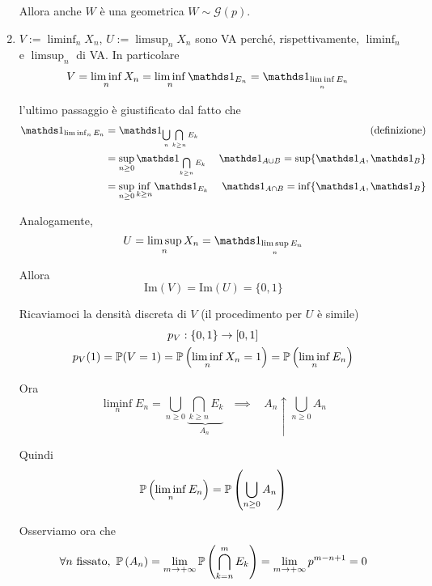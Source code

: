 \begin{enumerate}
Allora anche $W$ è una geometrica $W\sim \mathcal{G}( p)$.
\item $V:=\liminf _{n} X_{n}$, $U:=\limsup _{n} X_{n}$ sono VA perché, rispettivamente, $\liminf _{n}$ e $\limsup _{n}$ di VA. In particolare\begin{align*}
V & =\liminf _{n} X_{n} =\liminf _{n}\Ind_{E_{n}} =\Ind_{\liminf\limits _{n} E_{n}}
\end{align*}

l'ultimo passaggio è giustificato dal fatto che\begin{equation*}
\begin{aligned}
\Ind_{\liminf _{n} E_{n}} & =\Ind_{\bigcup\limits _{n}\bigcap\limits _{k\geq n} E_{k}} & \text{(definizione)}\\
 & =\sup\limits _{n\geq 0}\Ind_{\bigcap\limits _{k\geq n} E_{k}} & \Ind_{A\cup B} =\sup \{\Ind_{A} ,\Ind_{B}\}\\
 & =\sup _{n\geq 0}\inf_{k\geq n}\Ind_{E_{k}} & \Ind_{A\cap B} =\inf\{\Ind_{A} ,\Ind_{B}\}
\end{aligned}
\end{equation*}

Analogamente,\begin{equation*}
U=\limsup _{n} X_{n} =\Ind_{\limsup\limits _{n} E_{n}}
\end{equation*}

Allora\begin{equation*}
\mathrm{Im}( V) =\mathrm{Im}( U) =\{0,1\}
\end{equation*}

Ricaviamoci la densità discreta di $V$ (il procedimento per $U$ è simile)\begin{gather*}
p_{V} :\{0,1\}\rightarrow [ 0,1]\\
p_{V}( 1) =\mathbb{P}( V=1) =\mathbb{P}\left(\liminf _{n} X_{n} =1\right) =\mathbb{P}\left(\liminf _{n} E_{n}\right)
\end{gather*}

Ora\begin{equation*}
\liminf _{n} E_{n} =\bigcup _{n\geq 0}\underbrace{\bigcap\limits _{k\geq n} E_{k}}_{A_{n} \ } \ \ \ \implies \ \ \ \ A_{n} \uparrow \bigcup _{n\geq 0} A_{n}
\end{equation*}

Quindi\begin{equation*}
\mathbb{P}\left(\liminf _{n} E_{n}\right) =\mathbb{P}\left(\bigcup _{n\geq 0} A_{n}\right)
\end{equation*}

Osserviamo ora che\begin{equation*}
\forall n\ \text{fissato} ,\ \PP\left( A_{n}\right) =\lim _{m\rightarrow +\infty }\PP\left(\bigcap\limits _{k=n}^{m} E_{k}\right) =\lim _{m\rightarrow +\infty } p^{m-n+1} =0
\end{equation*}


\end{enumerate}
